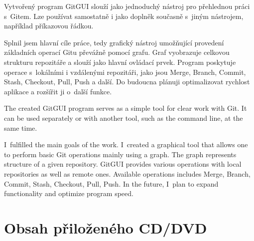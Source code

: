 \documentclass[
  biblatex,
  glossaries,
  index
]{kidiplom}
\begin{document}
\begin{kiconclusions}
Vytvořený program GitGUI slouží jako jednoduchý nástroj pro přehlednou práci s~Gitem. Lze používat samostatně i jako doplněk současně s~jiným nástrojem, například příkazovou řádkou.

Splnil jsem hlavní cíle práce, tedy grafický nástroj umožňující provedení základních operací Gitu převážně pomocí grafu. Graf vyobrazuje celkovou strukturu repozitáře a slouží jako hlavní ovládací prvek. Program poskytuje operace s~lokálními i vzdálenými repozitáři, jako jsou Merge, Branch, Commit, Stash, Checkout, Pull, Push a další. Do budoucna plánuji optimalizovat rychlost aplikace a rozšířit ji o~další funkce.
\end{kiconclusions}

\begin{kiconclusions}[english]
The created GitGUI program serves as a simple tool for clear work with Git. It can be used separately or with another tool, such as the command line, at the same time.

I~fulfilled the main goals of the work. I~created a graphical tool that allows one to perform basic Git operations mainly using a graph. The graph represents structure of a given repository. GitGUI provides various operations with local repositories as well as remote ones. Available operations includes Merge, Branch, Commit, Stash, Checkout, Pull, Push. In the future, I~plan to expand functionality and optimize program speed.

\end{kiconclusions}

\appendix

\section{Obsah přiloženého CD/DVD} \label{sec:ObsahCD}
\end{document}
